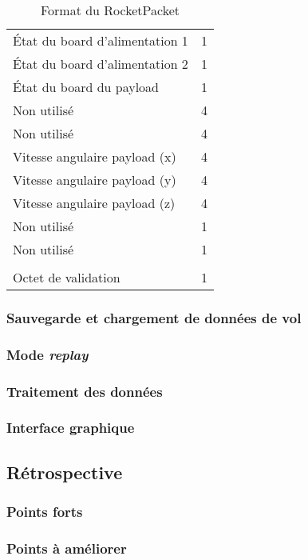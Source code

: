 \begin{table}
\begin{tabular}{|l|l|}
        État du board d'alimentation 1 & 1 \\
        État du board d'alimentation 2 & 1 \\
        État du board du payload & 1 \\
        Non utilisé & 4 \\
        Non utilisé & 4 \\
        Vitesse angulaire payload (x) & 4 \\
        Vitesse angulaire payload (y) & 4 \\
        Vitesse angulaire payload (z) & 4 \\
        Non utilisé & 1 \\
        Non utilisé & 1 \\
        &\\
        Octet de validation & 1 \\
        \hline
    \end{tabular}
    \caption{Format du RocketPacket}
    \label{LogicielRealisationFormatPacket}
\end{table}

\subsubsection{Sauvegarde et chargement de données de vol}


\subsubsection{Mode \textit{replay}}


\subsubsection{Traitement des données}


\subsubsection{Interface graphique}


\subsection{Rétrospective}

\subsubsection{Points forts}


\subsubsection{Points à améliorer}
